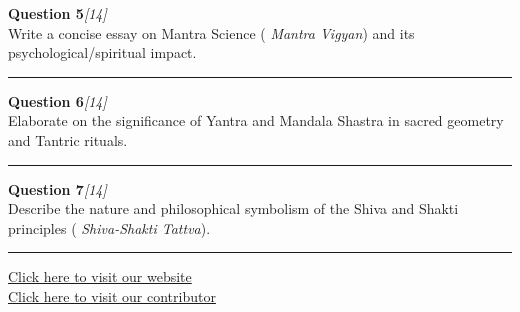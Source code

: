 \documentclass[11pt,a4paper]{article}
\newcommand{\pts}[1]{\hfill   \textit{[#1]}}
\begin{document}
\noindent   \textbf{Question 5}\pts{14} \\
Write a concise essay on Mantra Science (   \textit{Mantra Vigyan}) and its psychological/spiritual impact.

\medskip\rule{\linewidth}{0.2pt}\medskip




\noindent   \textbf{Question 6}\pts{14} \\
Elaborate on the significance of Yantra and Mandala Shastra in sacred geometry and Tantric rituals.

\medskip\rule{\linewidth}{0.2pt}\medskip




\noindent   \textbf{Question 7}\pts{14} \\
Describe the nature and philosophical symbolism of the Shiva and Shakti principles (   \textit{Shiva-Shakti Tattva}).

\vfill\rule{\linewidth}{0.4pt}

\begin{center}\small
\href{https://bhu-exam.vercel.app/}{Click here to visit our website}\\[4pt]
\href{https://me-aryan.vercel.app/}{Click here to visit our contributor}
\end{center}
\end{document}
